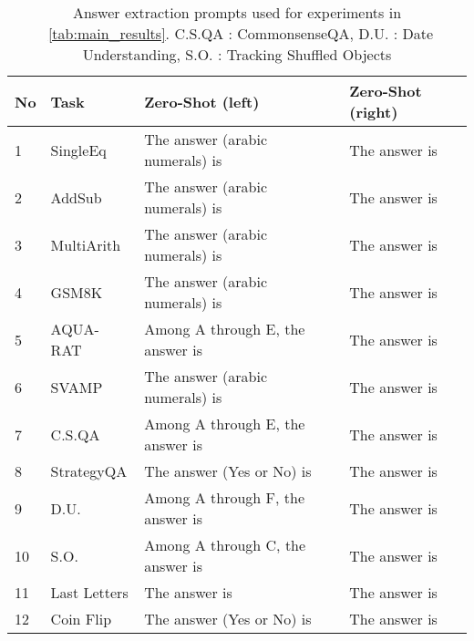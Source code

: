 \begin{table}[h]\centering
\caption{Answer extraction prompts used for \theirsz experiments in ~\autoref{tab:main_results}. C.S.QA : CommonsenseQA, D.U. : Date Understanding, S.O. : Tracking Shuffled Objects}
\label{tab:answer_prompts_1}
\begin{tabular}{p{}p{}p{}p{}}
\toprule
No &Task &Zero-Shot (left) &Zero-Shot (right) \\

\midrule

1 &SingleEq &The answer (arabic numerals) is &The answer is \\
2 &AddSub &The answer (arabic numerals) is &The answer is \\
3 &MultiArith &The answer (arabic numerals) is &The answer is \\
4 &GSM8K &The answer (arabic numerals) is &The answer is \\
5 &AQUA-RAT &Among A through E, the answer is &The answer is \\
6 &SVAMP &The answer (arabic numerals) is &The answer is \\
7 &C.S.QA &Among A through E, the answer is &The answer is \\
8 &StrategyQA &The answer (Yes or No) is &The answer is \\
9 &D.U. &Among A through F, the answer is &The answer is \\
10 &S.O. &Among A through C, the answer is &The answer is \\
11 &Last Letters &The answer is &The answer is \\
12 &Coin Flip &The answer (Yes or No) is &The answer is \\
\bottomrule
\end{tabular}
\end{table}


